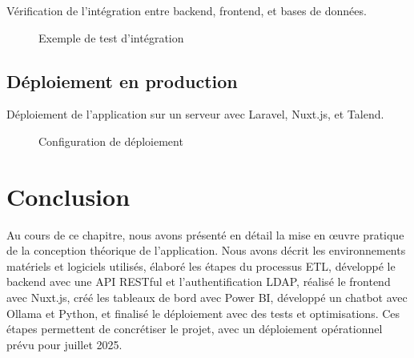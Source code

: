 Vérification de l’intégration entre backend, frontend, et bases de données.

\begin{figure}[h]
    \centering
    \caption{Exemple de test d’intégration}
    \label{fig:integration_test}
\end{figure}

\subsection{Déploiement en production}

Déploiement de l’application sur un serveur avec Laravel, Nuxt.js, et Talend.

\begin{figure}[h]
    \centering
    \caption{Configuration de déploiement}
    \label{fig:deployment}
\end{figure}

\section*{Conclusion}
Au cours de ce chapitre, nous avons présenté en détail la mise en œuvre pratique de la conception théorique de l’application. Nous avons décrit les environnements matériels et logiciels utilisés, élaboré les étapes du processus ETL, développé le backend avec une API RESTful et l’authentification LDAP, réalisé le frontend avec Nuxt.js, créé les tableaux de bord avec Power BI, développé un chatbot avec Ollama et Python, et finalisé le déploiement avec des tests et optimisations. Ces étapes permettent de concrétiser le projet, avec un déploiement opérationnel prévu pour juillet 2025.

